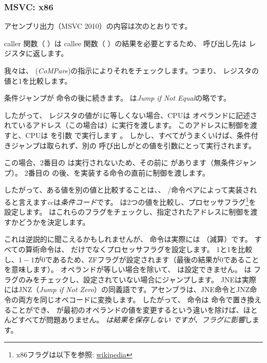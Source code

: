 \subsubsection{MSVC: x86}

アセンブリ出力（MSVC 2010）の内容は次のとおりです。



\gls{caller} 関数（ \main ）は \gls{callee} 関数（ \scanf ）の結果を必要とするため、
呼び出し先は \EAX レジスタに返します。

我々は、 (\emph{CoMPare})の指示によりそれをチェックします。つまり、 \EAX レジスタの値と1を比較します。

\JNE 条件ジャンプが \CMP 命令の後に続きます。  \JNE は\emph{Jump if Not Equal}の略です。

したがって、 \EAX レジスタの値が1に等しくない場合、\ac{CPU}は \JNE オペランドに記述されているアドレス（この場合は）に実行を渡します。
このアドレスに制御を渡すと、\ac{CPU}は \printf を引数 で実行します 。
しかし、すべてがうまくいけば、条件付きジャンプは取られず、別の \printf 呼び出しがとの値を引数にとって実行されます。

この場合、2番目の \printf は実行されないため、その前に \JMP があります（無条件ジャンプ）。
2番目の \printf の後、を実装する命令の直前に制御を渡します。

したがって、ある値を別の値と比較することは、、 \CMP/\Jcc 命令ペアによって実装されると言えます\emph{cc}は\emph{条件コード}です。 
\CMP は2つの値を比較し、プロセッサフラグ\footnote{x86フラグは以下を参照: \href{http://en.wikipedia.org/wiki/FLAGS_register_(computing)}{wikipedia}}を設定します。 
\Jcc はこれらのフラグをチェックし、指定されたアドレスに制御を渡すかどうかを決定します。

\label{CMPandSUB}
これは逆説的に聞こえるかもしれませんが、 \CMP 命令は実際には \SUB （減算）です。
すべての算術命令は、 \CMP だけでなくプロセッサフラグを設定します。 1と1を比較し、$1-1$が0であるため、ZFフラグが設定されます（最後の結果が0であることを意味します）。
オペランドが等しい場合を除いて、 \ZF は設定できません。  \JNE は \ZF フラグのみをチェックし、設定されていない場合にジャンプします。 
JNEは実際にはJNZ（\emph{Jump if Not Zero}）の同義語です。アセンブラは、JNE命令とJNZ命令の両方を同じオペコードに変換します。
したがって、 \CMP 命令は \SUB 命令で置き換えることができ、 \SUB が最初のオペランドの値を変更するという違いを除けば、ほとんどすべてが問題ありません。 
\CMP \emph{は結果を保存しない \SUB ですが、フラグに影響}します。


